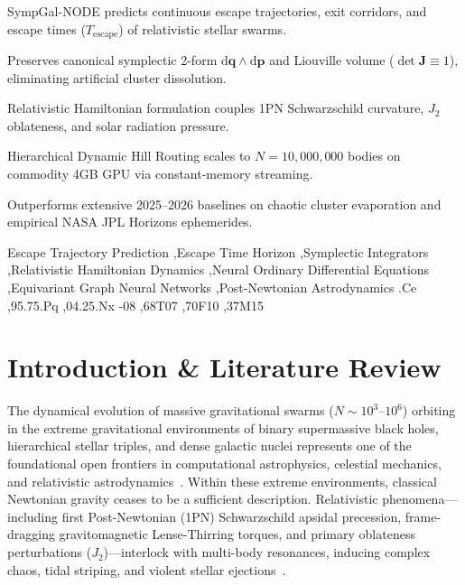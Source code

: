 \documentclass[preprint,12pt,3p]{elsarticle}
\begin{document}
\begin{frontmatter}
\begin{highlights}
\item SympGal-NODE predicts continuous escape trajectories, exit corridors, and escape times ($T_{\mathrm{escape}}$) of relativistic stellar swarms.
\item Preserves canonical symplectic 2-form $\mathrm{d}\bm{q} \wedge \mathrm{d}\bm{p}$ and Liouville volume ($\det \bm{J} \equiv 1$), eliminating artificial cluster dissolution.
\item Relativistic Hamiltonian formulation couples 1PN Schwarzschild curvature, $J_2$ oblateness, and solar radiation pressure.
\item Hierarchical Dynamic Hill Routing scales to $N = 10,000,000$ bodies on commodity 4GB GPU via constant-memory streaming.
\item Outperforms extensive 2025--2026 baselines on chaotic cluster evaporation and empirical NASA JPL Horizons ephemerides.
\end{highlights}

\begin{keyword}
Escape Trajectory Prediction \sep Escape Time Horizon \sep Symplectic Integrators \sep Relativistic Hamiltonian Dynamics \sep Neural Ordinary Differential Equations \sep Equivariant Graph Neural Networks \sep Post-Newtonian Astrodynamics
.Ce \sep 95.75.Pq \sep 04.25.Nx
-08 \sep 68T07 \sep 70F10 \sep 37M15
\end{keyword}

\end{frontmatter}

\section{Introduction \& Literature Review}\label{sec:intro}

The dynamical evolution of massive gravitational swarms ($N \sim 10^3$--$10^6$) orbiting in the extreme gravitational environments of binary supermassive black holes, hierarchical stellar triples, and dense galactic nuclei represents one of the foundational open frontiers in computational astrophysics, celestial mechanics, and relativistic astrodynamics~\cite{binney2008galactic,heggie2003gravitational}. Within these extreme environments, classical Newtonian gravity ceases to be a sufficient description. Relativistic phenomena---including first Post-Newtonian (1PN) Schwarzschild apsidal precession, frame-dragging gravitomagnetic Lense-Thirring torques, and primary oblateness perturbations ($J_2$)---interlock with multi-body resonances, inducing complex chaos, tidal striping, and violent stellar ejections~\cite{damour1985general,blanchet2014gravitational,will2014confrontation}. 
\end{document}
